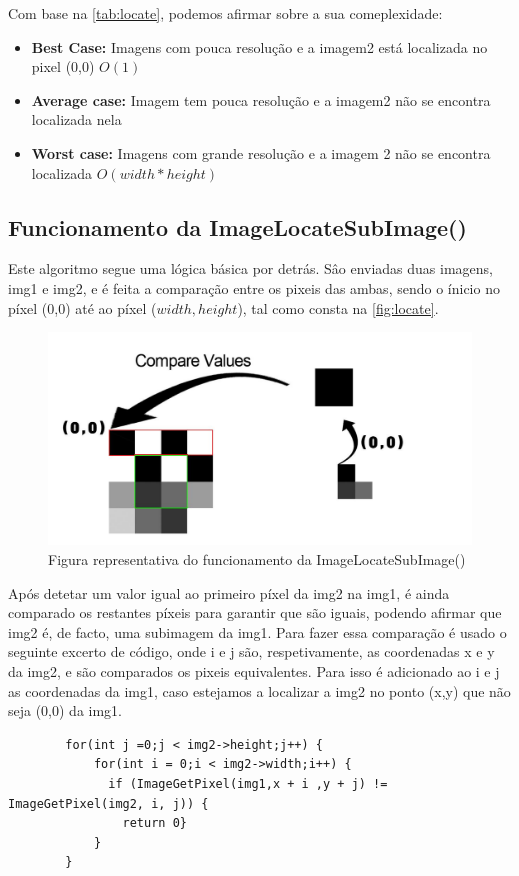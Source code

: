 \newpage 

\par Com base na \autoref{tab:locate}, podemos afirmar sobre a sua comeplexidade:
\begin{itemize}
    \item \textbf{Best Case:} Imagens com pouca resolução e a imagem2 está localizada no pixel (0,0) $O(1)$
    \item \textbf{Average case:} Imagem tem pouca resolução e a imagem2 não se encontra localizada nela
    \item \textbf{Worst case:} Imagens com grande resolução e a imagem 2 não se encontra localizada $O(width * height)$
\end{itemize}

\subsection{Funcionamento da ImageLocateSubImage()}
    \par Este algoritmo segue uma lógica básica por detrás. Sâo enviadas duas imagens, img1 e img2, e é feita 
        a comparação entre os pixeis das ambas, sendo o ínicio no píxel (0,0) até ao píxel ($width,height$),
        tal como consta na \autoref{fig:locate}.

    \begin{figure} [H]
        \centering
        \includegraphics[scale=0.25]{images/Locate_Function.pdf}
        \caption{Figura representativa do funcionamento da ImageLocateSubImage()}
        \label{fig:locate}
    \end{figure}

    \par Após detetar um valor igual ao primeiro píxel da img2 na img1, é ainda comparado os restantes píxeis para 
        garantir que são iguais, podendo afirmar que img2 é, de facto, uma subimagem da img1. Para fazer essa 
        comparação é usado o seguinte excerto de código, onde i e j são, respetivamente, as coordenadas x e y da 
        img2, e são comparados os pixeis equivalentes. Para isso é adicionado ao i e j as coordenadas da img1, caso
        estejamos a localizar a img2 no ponto (x,y) que não seja (0,0) da img1.

    \begin{lstlisting}
        for(int j =0;j < img2->height;j++) {
            for(int i = 0;i < img2->width;i++) {
              if (ImageGetPixel(img1,x + i ,y + j) != ImageGetPixel(img2, i, j)) {
                return 0}
            }
        }
    \end{lstlisting}

